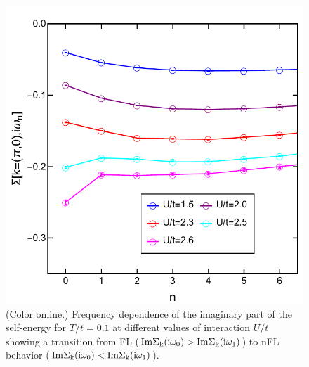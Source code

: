 \documentclass[twocolumn,notitlepage,prl,superscriptaddress,showpacs]{revtex4-1}
\begin{document}
\begin{figure}
\centering
\includegraphics[width=\linewidth]{HF_freq.pdf}
\caption{\label{fig:freqdep}(Color online.) Frequency dependence  of the imaginary part of the self-energy for $T/t=0.1$ at different values of interaction $U/t$ showing a transition from FL ($\rm{Im}\Sigma_k (i\omega_0) >\rm{Im}\Sigma_k (i\omega_1)$) to nFL behavior ($\rm{Im}\Sigma_k (i\omega_0) <\rm{Im}\Sigma_k (i\omega_1)$).}
\end{figure}
\end{document}
